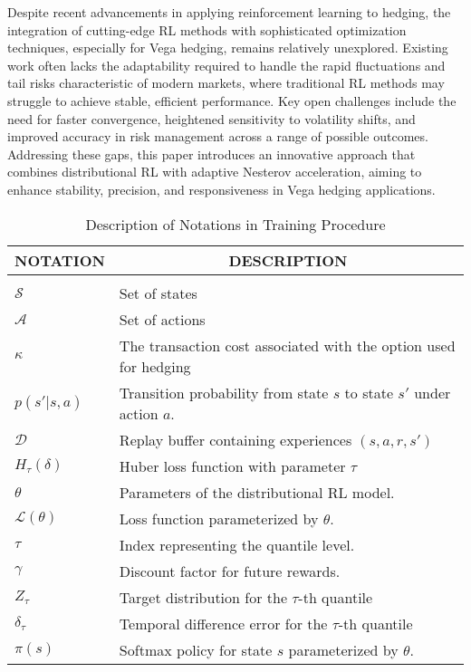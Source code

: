 Despite recent advancements in applying reinforcement learning to hedging, the integration of cutting-edge RL methods with sophisticated optimization techniques, especially for Vega hedging, remains relatively unexplored. Existing work often lacks the adaptability required to handle the rapid fluctuations and tail risks characteristic of modern markets, where traditional RL methods may struggle to achieve stable, efficient performance. Key open challenges include the need for faster convergence, heightened sensitivity to volatility shifts, and improved accuracy in risk management across a range of possible outcomes. Addressing these gaps, this paper introduces an innovative approach that combines distributional RL with adaptive Nesterov acceleration, aiming to enhance stability, precision, and responsiveness in Vega hedging applications.

\begin{table}[t]
	\caption{Description of Notations in Training Procedure}
	\label{sample-table}
	\begin{center}
		\begin{tabular}{ll}
			\multicolumn{1}{c}{\bf NOTATION}  &\multicolumn{1}{c}{\bf DESCRIPTION}
			\\ \hline \\
			$\mathcal{S}$ & Set of states\\
			$\mathcal{A}$ & Set of actions\\
			$\kappa$      &  The transaction cost associated with the option used for hedging\\
			$p(s' | s, a)$ & Transition probability from state $s$ to state $s'$ under action $a$.\\
			$\mathcal{D}$ & Replay buffer containing experiences $(s, a, r, s')$\\
			$H_{\tau}(\delta)$& Huber loss function with parameter $\tau$\\
			$\theta$ & Parameters of the distributional RL model.\\
			$\mathcal{L}(\theta)$ & Loss function parameterized by $\theta$.\\
			$\tau$ & Index representing the quantile level.\\
			$\gamma$ & Discount factor for future rewards.\\
			$Z_{\tau}$& Target distribution for the $\tau$-th quantile\\
			$\delta_{\tau}$ & Temporal difference error for the $\tau$-th quantile \\
			$\pi(s)$ & Softmax policy for state $s$ parameterized by $\theta$.
			\\ \hline
		\end{tabular}
	\end{center}
\end{table}